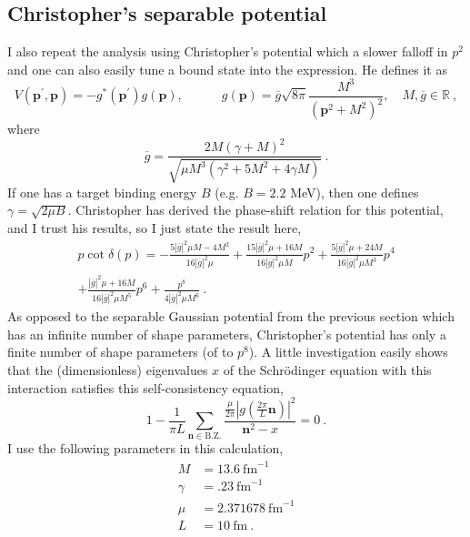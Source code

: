 \documentclass[11pt]{article}
\begin{document}
\subsection{Christopher's separable potential}
I also repeat the analysis using Christopher's potential which a slower falloff in $p^2$ and one can also easily tune a bound state into the expression.  He defines it as
\begin{equation}\label{eqn:koerber potential}
V\left(\boldsymbol{p}^{\prime}, \boldsymbol{p}\right)=-g^{*}\left(\boldsymbol{p}^{\prime}\right) g(\boldsymbol{p}), \quad \quad \quad g(\boldsymbol{p})=\overline{g} \sqrt{8 \pi} \frac{M^{3}}{\left(\boldsymbol{p}^{2}+M^{2}\right)^{2}}, \quad M, \overline{g} \in \mathbb{R}\ ,
\end{equation}
where
\begin{equation}
\overline{g}=\frac{2 M(\gamma+M)^{2}}{\sqrt{\mu M^{3}\left(\gamma^{2}+5 M^{2}+4 \gamma M\right)}}\ .
\end{equation}
If one has a target binding energy $B$ (e.g. $B=2.2$ MeV), then one defines $\gamma=\sqrt{2\mu B}$.  Christopher has derived the phase-shift relation for this potential, and I trust his results, so I just state the result here,
\begin{multline}
p\cot\delta(p) = -\frac{5|\overline{g}|^{2} \mu M-4 M^{2}}{16|\overline{g}|^{2} \mu}+\frac{15|\overline{g}|^{2} \mu+16 M}{16|\overline{g}|^{2} \mu M} p^{2}+\frac{5|\overline{g}|^{2} \mu+24 M}{16|\overline{g}|^{2} \mu M^{3}} p^{4}\\
+\frac{|\overline{g}|^{2} \mu+16 M}{16|\overline{g}|^{2} \mu M^{5}} p^{6}+\frac{ p^{8}}{4|\overline{g}|^{2} \mu M^{6}}\ .
\end{multline}
As opposed to the separable Gaussian potential from the previous section which has an infinite number of shape parameters, Christopher's potential has only a finite number of shape parameters (of to $p^8$).  A little investigation easily shows that the (dimensionless) eigenvalues $x$ of the Schr\"odinger equation with this interaction satisfies this self-consistency equation,
\begin{equation}
1-\frac{1}{\pi L}\sum_{\bm n\in\mathrm{B.Z.}}\frac{\frac{\mu}{2\pi}\left|g\left(\frac{2\pi}{L}\bm n\right)\right|^2}{\bm n^2-x}=0\ .
\end{equation}
I use the following parameters in this calculation,
\begin{align*}
M&=13.6\ \mathrm{ fm}^{-1}\\
\gamma&=.23\ \mathrm{ fm}^{-1}\\
\mu&=2.371678\ \mathrm{ fm}^{-1}\\
L&=10\ \mathrm{ fm}\ .
\end{align*}
\end{document}
